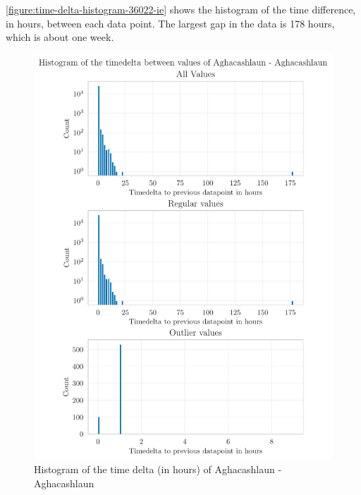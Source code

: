 \autoref{figure:time-delta-histogram-36022-ie} shows the histogram of the time difference, in hours, between each data point. The largest gap in the data is 178 hours, which is about one week.
\begin{figure}[htp]
    \centering
    \includegraphics{./plots/pdfs/36022-ie/time_delta_histogram_36022-ie.pdf}
    \caption{Histogram of the time delta (in hours) of Aghacashlaun - Aghacashlaun}
    \label{figure:time-delta-histogram-36022-ie}
\end{figure}

